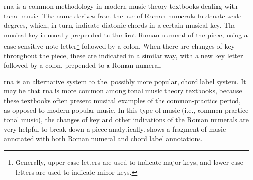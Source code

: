 

\gls{rna} is a common methodology in modern music theory
textbooks dealing with tonal music. The name derives from
the use of Roman numerals to denote scale degrees, which, in
turn, indicate diatonic chords in a certain musical key. The
musical key is usually prepended to the first Roman numeral
of the piece, using a case-sensitive note
letter\footnote{Generally, upper-case letters are used to
indicate major keys, and lower-case letters are used to
indicate minor keys.} followed by a colon. When there are
changes of key throughout the piece, these are indicated in
a similar way, with a new key letter followed by a colon,
prepended to a Roman numeral.

\gls{rna} is an alternative system to the, possibly more
popular, chord label system. It may be that \gls{rna} is
more common among tonal music theory textbooks, because
these textbooks often present musical examples of the
common-practice period, as opposed to modern popular music.
In this type of music (i.e., common-practice tonal music),
the changes of key and other indications of the Roman
numerals are very helpful to break down a piece
analytically.  shows a fragment of music
annotated with both Roman numeral and chord label
annotations.

